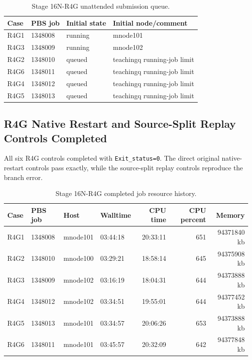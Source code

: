 \documentclass[11pt,a4paper]{article}
\newcommand{\code}[1]{\texttt{#1}}
\begin{document}
\begin{table}[H]
\centering
\caption{Stage 16N-R4G unattended submission queue.}
\begin{tabular}{llll}
\toprule
Case & PBS job & Initial state & Initial node/comment \\
\midrule
R4G1 & 1348008 & running & mnode101 \\
R4G3 & 1348009 & running & mnode102 \\
R4G2 & 1348010 & queued & teachingq running-job limit \\
R4G6 & 1348011 & queued & teachingq running-job limit \\
R4G4 & 1348012 & queued & teachingq running-job limit \\
R4G5 & 1348013 & queued & teachingq running-job limit \\
\bottomrule
\end{tabular}
\end{table}

\subsection{R4G Native Restart and Source-Split Replay Controls Completed}

All six R4G controls completed with \code{Exit\_status=0}. The direct original native-restart controls pass exactly, while the source-split replay controls reproduce the branch error.

\begin{table}[H]
\centering
\caption{Stage 16N-R4G completed job resource history.}
\begin{tabular}{llllrrr}
\toprule
Case & PBS job & Host & Walltime & CPU time & CPU percent & Memory \\
\midrule
R4G1 & 1348008 & mnode101 & 03:44:18 & 20:33:11 & 651 & 94371840 kb \\
R4G2 & 1348010 & mnode100 & 03:29:21 & 18:58:14 & 645 & 94375908 kb \\
R4G3 & 1348009 & mnode102 & 03:16:19 & 18:04:31 & 644 & 94373888 kb \\
R4G4 & 1348012 & mnode102 & 03:34:51 & 19:55:01 & 644 & 94377452 kb \\
R4G5 & 1348013 & mnode101 & 03:34:57 & 20:06:26 & 653 & 94373888 kb \\
R4G6 & 1348011 & mnode101 & 03:45:57 & 20:32:09 & 642 & 94377848 kb \\
\bottomrule
\end{tabular}
\end{table}
\end{document}
